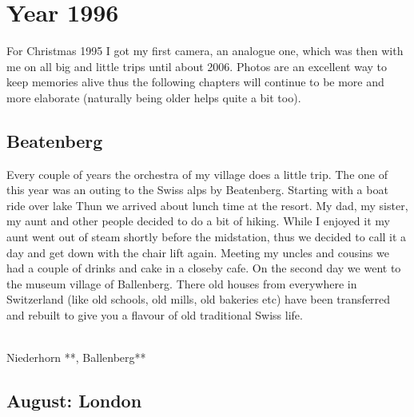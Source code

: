 \chapter{Year 1996}
\label{1996}

For Christmas 1995 I got my first camera, an analogue one, which was then with me on all big and little trips until about 2006. Photos are an excellent way to keep memories alive thus the following chapters will continue to be more and more elaborate (naturally being older helps quite a bit too).

\section{Beatenberg}
\label{1996:Beatenberg}

Every couple of years the orchestra of my village does a little trip. The one of this year was an outing to the Swiss alps by Beatenberg. Starting with a boat ride over lake Thun we arrived about lunch time at the resort. My dad, my sister, my aunt and other people decided to do a bit of hiking. While I enjoyed it my aunt went out of steam shortly before the midstation, thus we decided to call it a day and get down with the chair lift again. Meeting my uncles and cousins we had a couple of drinks and cake in a closeby cafe. On the second day we went to the museum village of Ballenberg. There old houses from everywhere in Switzerland (like old schools, old mills, old bakeries etc) have been transferred and rebuilt to give you a flavour of old traditional Swiss life. \\\

Niederhorn **, Ballenberg**

\section{August: London}
\label{1996:London}


